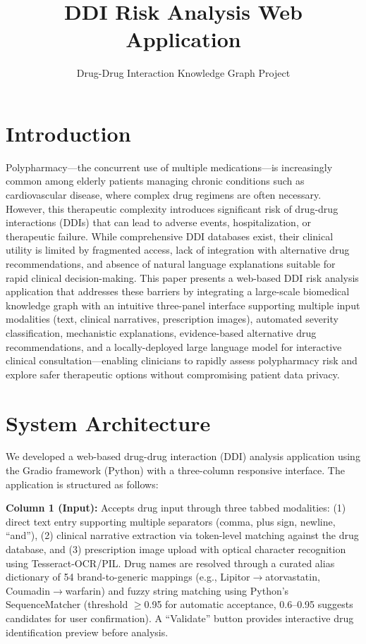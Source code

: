 \documentclass[11pt,a4paper]{article}
\title{\textbf{DDI Risk Analysis Web Application}}
\author{Drug-Drug Interaction Knowledge Graph Project}
\date{}
\begin{document}
\maketitle

\section{Introduction}

Polypharmacy---the concurrent use of multiple medications---is increasingly common among elderly patients managing chronic conditions such as cardiovascular disease, where complex drug regimens are often necessary. However, this therapeutic complexity introduces significant risk of drug-drug interactions (DDIs) that can lead to adverse events, hospitalization, or therapeutic failure. While comprehensive DDI databases exist, their clinical utility is limited by fragmented access, lack of integration with alternative drug recommendations, and absence of natural language explanations suitable for rapid clinical decision-making. This paper presents a web-based DDI risk analysis application that addresses these barriers by integrating a large-scale biomedical knowledge graph with an intuitive three-panel interface supporting multiple input modalities (text, clinical narratives, prescription images), automated severity classification, mechanistic explanations, evidence-based alternative drug recommendations, and a locally-deployed large language model for interactive clinical consultation---enabling clinicians to rapidly assess polypharmacy risk and explore safer therapeutic options without compromising patient data privacy.

\section{System Architecture}

We developed a web-based drug-drug interaction (DDI) analysis application using the Gradio framework (Python) with a three-column responsive interface. The application is structured as follows:

\textbf{Column 1 (Input):} Accepts drug input through three tabbed modalities: (1) direct text entry supporting multiple separators (comma, plus sign, newline, ``and''), (2) clinical narrative extraction via token-level matching against the drug database, and (3) prescription image upload with optical character recognition using Tesseract-OCR/PIL. Drug names are resolved through a curated alias dictionary of 54 brand-to-generic mappings (e.g., Lipitor$\rightarrow$atorvastatin, Coumadin$\rightarrow$warfarin) and fuzzy string matching using Python's SequenceMatcher (threshold $\geq$0.95 for automatic acceptance, 0.6--0.95 suggests candidates for user confirmation). A ``Validate'' button provides interactive drug identification preview before analysis.
\end{document}

